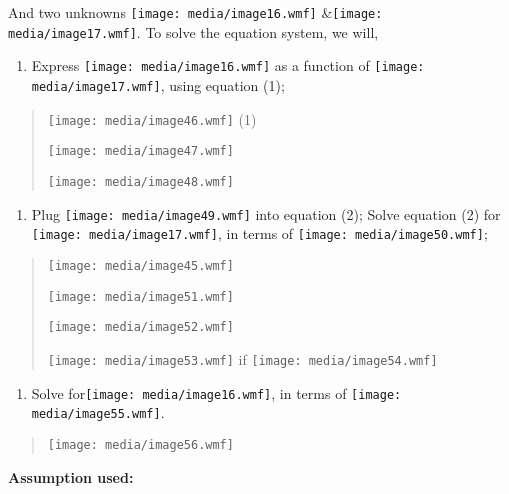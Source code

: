 And two unknowns \texttt{[image: media/image16.wmf]}
\&\texttt{[image: media/image17.wmf]}. To solve the equation system, we
will,

\begin{enumerate}
\def\labelenumi{(\alph{enumi})}
\item
  Express \texttt{[image: media/image16.wmf]} as a function of
  \texttt{[image: media/image17.wmf]}, using equation (1);
\end{enumerate}

\begin{quote}
\texttt{[image: media/image46.wmf]} (1)

\texttt{[image: media/image47.wmf]}

\texttt{[image: media/image48.wmf]}
\end{quote}

\begin{enumerate}
\def\labelenumi{(\alph{enumi})}
\setcounter{enumi}{1}
\item
  Plug \texttt{[image: media/image49.wmf]} into equation (2); Solve
  equation (2) for \texttt{[image: media/image17.wmf]}, in terms of
  \texttt{[image: media/image50.wmf]};
\end{enumerate}

\begin{quote}
\texttt{[image: media/image45.wmf]}

\texttt{[image: media/image51.wmf]}

\texttt{[image: media/image52.wmf]}

\texttt{[image: media/image53.wmf]} if
\texttt{[image: media/image54.wmf]}
\end{quote}

\begin{enumerate}
\def\labelenumi{(\alph{enumi})}
\setcounter{enumi}{2}
\item
  Solve for\texttt{[image: media/image16.wmf]}, in terms of
  \texttt{[image: media/image55.wmf]}.
\end{enumerate}

\begin{quote}
\texttt{[image: media/image56.wmf]}
\end{quote}

\textbf{Assumption used:}

